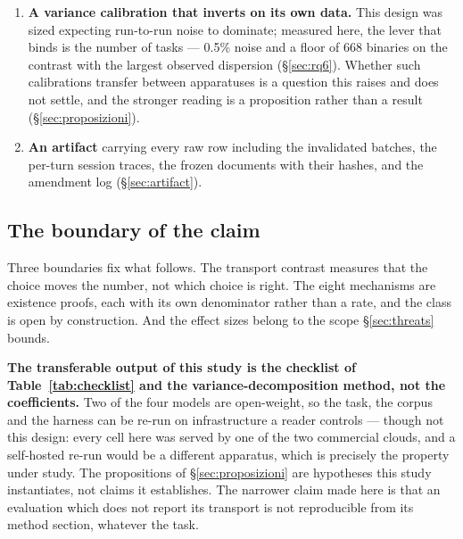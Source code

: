 \begin{enumerate}
\item \textbf{A variance calibration that inverts on its own data.} This design was sized expecting
  run-to-run noise to dominate; measured here, the lever that binds is the number of tasks --- 0.5\% noise
  and a floor of 668 binaries on the contrast with the largest observed dispersion
  (\S\ref{sec:rq6}). Whether such
  calibrations transfer between apparatuses is a question this raises and does not settle, and the stronger
  reading is a proposition rather than a result (\S\ref{sec:proposizioni}).
\item \textbf{An artifact} carrying every raw row including the invalidated batches, the per-turn session
  traces, the frozen documents with their hashes, and the amendment log (\S\ref{sec:artifact}).
\end{enumerate}

\subsection{The boundary of the claim}

Three boundaries fix what follows. The transport contrast measures that the choice moves the number, not
which choice is right. The eight mechanisms are existence proofs, each with its own denominator rather than
a rate, and the class is open by construction. And the effect sizes belong to the scope
\S\ref{sec:threats} bounds.

\textbf{The transferable output of this study is the checklist of Table~\ref{tab:checklist} and the
variance-decomposition method, not the coefficients.} Two of the four models are open-weight, so the task,
the corpus and the harness can be re-run on infrastructure a reader controls --- though not this design:
every cell here was served by one of the two commercial clouds, and a self-hosted re-run would be a
different apparatus, which is precisely the property under study. The propositions of
\S\ref{sec:proposizioni} are hypotheses this study instantiates, not claims it establishes. The narrower
claim made here is that an evaluation which does not report its transport is not reproducible from its
method section, whatever the task.